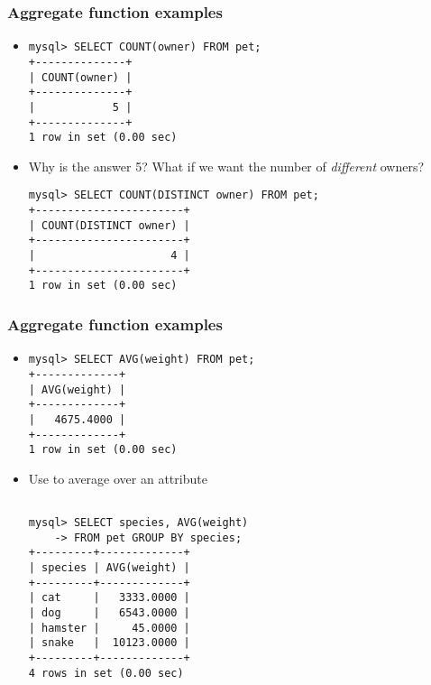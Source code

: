 \documentclass[hyperref={pdfpagelabels=false},svgnames,xcolor=table]{beamer}
\begin{document}
\begin{frame}[shrink=10,fragile]
  \frametitle{Aggregate function examples}
  \begin{itemize}
    \item {\color{blue}{COUNT}}
\begin{verbatim}
mysql> SELECT COUNT(owner) FROM pet;
+--------------+
| COUNT(owner) |
+--------------+
|            5 |
+--------------+
1 row in set (0.00 sec)

\end{verbatim}
    \item Why is the answer 5? What if we want the number of \emph{different}
      owners?
\begin{verbatim}
mysql> SELECT COUNT(DISTINCT owner) FROM pet;
+-----------------------+
| COUNT(DISTINCT owner) |
+-----------------------+
|                     4 |
+-----------------------+
1 row in set (0.00 sec)
\end{verbatim}
  \end{itemize}
\end{frame}

\begin{frame}[shrink=10,fragile]
  \frametitle{Aggregate function examples}
  \begin{itemize}
    \item {\color{blue}{AVG}}
\begin{verbatim}
mysql> SELECT AVG(weight) FROM pet;
+-------------+
| AVG(weight) |
+-------------+
|   4675.4000 |
+-------------+
1 row in set (0.00 sec)

\end{verbatim}
    \item Use {\color{blue}{GROUP BY}} to average over an attribute
\begin{verbatim}

mysql> SELECT species, AVG(weight) 
    -> FROM pet GROUP BY species;
+---------+-------------+
| species | AVG(weight) |
+---------+-------------+
| cat     |   3333.0000 |
| dog     |   6543.0000 |
| hamster |     45.0000 |
| snake   |  10123.0000 |
+---------+-------------+
4 rows in set (0.00 sec)
\end{verbatim}
  \end{itemize}
\end{frame}
\end{document}
